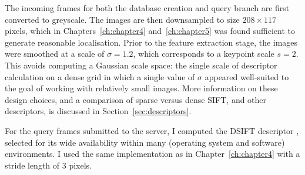 The incoming frames for both the database creation and query branch are first converted to greyscale. The images are then downsampled to size $208 \times 117$ pixels, which in Chapters~\ref{ch:chapter4} and~\ref{ch:chapter5} was found sufficient to generate reasonable localisation. Prior to the feature extraction stage, the images were smoothed at a scale of $\sigma = 1.2$, which corresponds to a keypoint scale $s = 2$. This avoids computing a Gaussian scale space: the single scale of descriptor calculation on a dense grid in which a single value of $\sigma$ appeared well-suited to the goal of working with relatively small images. More information on these design choices, and a comparison of sparse versus dense SIFT, and other descriptors, is discussed in Section~\ref{sec:descriptors}.





For the query frames submitted to the server, I computed the DSIFT descriptor \citep{Lowe1999,LazebnikSP06}, selected for its wide availability within many (operating system and software) environments.  I used the same implementation as in Chapter~\ref{ch:chapter4} with a stride length of 3 pixels. %


